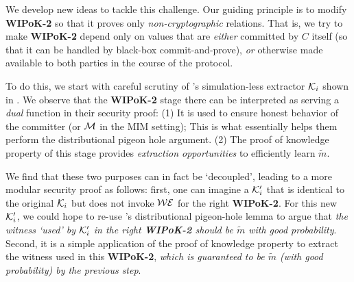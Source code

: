 We develop new ideas to tackle this challenge. Our guiding principle is to modify {\bf WIPoK-2} so that it proves only {\em non-cryptographic} relations. That is, we try to make {\bf WIPoK-2} depend only on values that are {\em either} committed by $C$ itself (so that it can be handled by black-box commit-and-prove), {\em or} otherwise made available to both parties in the course of the protocol. 

To do this, we start with careful scrutiny of \cite{FOCS:LPY23}'s simulation-less extractor $\mathcal{K}_i$ shown in . We observe that the {\bf WIPoK-2} stage there can be interpreted as serving a {\em dual} function in their security proof: (1) It is used to ensure honest behavior of the committer (or $\mathcal{M}$ in the MIM setting); This is what essentially helps them perform the distributional pigeon hole argument. (2) The proof of knowledge property of this stage provides {\em extraction opportunities} to efficiently  learn $\tilde{m}$. 

We find that these two purposes can in fact be `decoupled', leading to a more modular security proof as follows: first, one can imagine a $\mathcal{K}'_i$ that is identical to the original $\mathcal{K}_i$ but does not invoke $\mathcal{WE}$ for the right {\bf WIPoK-2}. For this new $\mathcal{K}'_i$, we could hope to re-use \cite{FOCS:LPY23}'s distributional pigeon-hole lemma to argue that {\em the witness `used' by $\mathcal{K}'_i$ in the right {\bf WIPoK-2} should be $\tilde{m}$ with good probability}. Second, it is a simple application of the proof of knowledge property to extract the witness used in this {\bf WIPoK-2}, {\em which is guaranteed to be $\tilde{m}$ (with good probability) by the previous step}.

